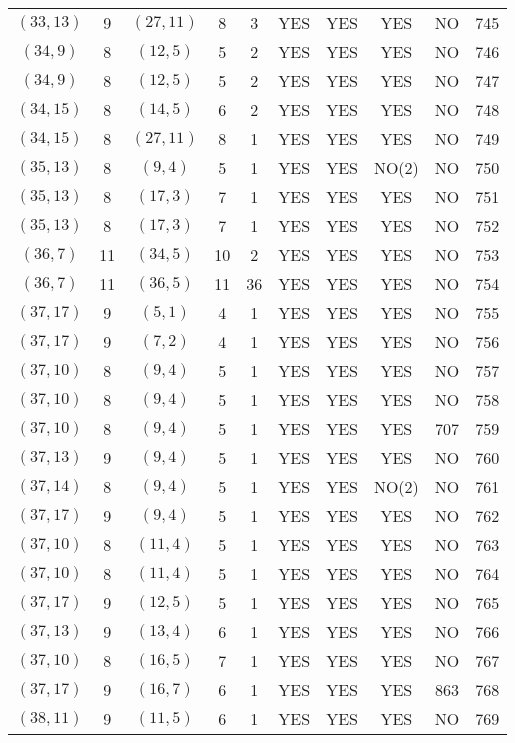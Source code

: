 \begin{longtable}{|c|c|c|c|c|c|c|c|c|c|}
$(33, 13)$ & 9 & $(27, 11)$ & 8 & 3 & YES & YES & YES & NO & 745\\
$(34, 9)$ & 8 & $(12, 5)$ & 5 & 2 & YES & YES & YES & NO & 746\\
$(34, 9)$ & 8 & $(12, 5)$ & 5 & 2 & YES & YES & YES & NO & 747\\
$(34, 15)$ & 8 & $(14, 5)$ & 6 & 2 & YES & YES & YES & NO & 748\\
$(34, 15)$ & 8 & $(27, 11)$ & 8 & 1 & YES & YES & YES & NO & 749\\
$(35, 13)$ & 8 & $(9, 4)$ & 5 & 1 & YES & YES & NO(2) & NO & 750\\
$(35, 13)$ & 8 & $(17, 3)$ & 7 & 1 & YES & YES & YES & NO & 751\\
$(35, 13)$ & 8 & $(17, 3)$ & 7 & 1 & YES & YES & YES & NO & 752\\
$(36, 7)$ & 11 & $(34, 5)$ & 10 & 2 & YES & YES & YES & NO & 753\\
$(36, 7)$ & 11 & $(36, 5)$ & 11 & 36 & YES & YES & YES & NO & 754\\
$(37, 17)$ & 9 & $(5, 1)$ & 4 & 1 & YES & YES & YES & NO & 755\\
$(37, 17)$ & 9 & $(7, 2)$ & 4 & 1 & YES & YES & YES & NO & 756\\
$(37, 10)$ & 8 & $(9, 4)$ & 5 & 1 & YES & YES & YES & NO & 757\\
$(37, 10)$ & 8 & $(9, 4)$ & 5 & 1 & YES & YES & YES & NO & 758\\
$(37, 10)$ & 8 & $(9, 4)$ & 5 & 1 & YES & YES & YES & 707 & 759\\
$(37, 13)$ & 9 & $(9, 4)$ & 5 & 1 & YES & YES & YES & NO & 760\\
$(37, 14)$ & 8 & $(9, 4)$ & 5 & 1 & YES & YES & NO(2) & NO & 761\\
$(37, 17)$ & 9 & $(9, 4)$ & 5 & 1 & YES & YES & YES & NO & 762\\
$(37, 10)$ & 8 & $(11, 4)$ & 5 & 1 & YES & YES & YES & NO & 763\\
$(37, 10)$ & 8 & $(11, 4)$ & 5 & 1 & YES & YES & YES & NO & 764\\
$(37, 17)$ & 9 & $(12, 5)$ & 5 & 1 & YES & YES & YES & NO & 765\\
$(37, 13)$ & 9 & $(13, 4)$ & 6 & 1 & YES & YES & YES & NO & 766\\
$(37, 10)$ & 8 & $(16, 5)$ & 7 & 1 & YES & YES & YES & NO & 767\\
$(37, 17)$ & 9 & $(16, 7)$ & 6 & 1 & YES & YES & YES & 863 & 768\\
$(38, 11)$ & 9 & $(11, 5)$ & 6 & 1 & YES & YES & YES & NO & 769\\

\end{longtable}
